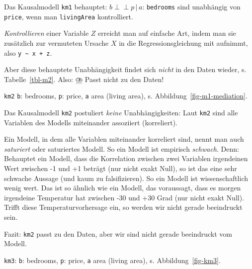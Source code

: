\documentclass[
  ngerman,
  letterpaper,
  twoside,
  open=any]{scrbook}
\theoremstyle{definition}
\theoremstyle{plain}
\theoremstyle{definition}
\theoremstyle{definition}
\theoremstyle{definition}
\theoremstyle{definition}
\theoremstyle{remark}
\begin{document}
Das Kausalmodell \texttt{km1} behauptet:
\(b \perp \!\!\! \perp p \, |\, a\): \texttt{bedrooms} sind unabhängig
von \texttt{price}, wenn man \texttt{livingArea} kontrolliert.

\emph{Kontrollieren} einer Variable \(Z\) erreicht man auf einfache Art,
indem man sie zusätzlich zur vermuteten Ursache \(X\) in die
Regressionsgleichung mit aufnimmt, also
\texttt{y\ \textasciitilde{}\ x\ +\ z}.

Aber diese behauptete Unabhängigkeit findet sich \emph{nicht} in den
Daten wieder, s. Tabelle~\ref{tbl-m2}. Also: ⛈️ Passt nicht zu den
Daten!

\texttt{km2} \texttt{b}: bedrooms, \texttt{p}: price, \texttt{a} area
(living area), s. Abbildung~\ref{fig-m1-mediation}.

Das Kausalmodell \texttt{km2} postuliert \emph{keine} Unabhängigkeiten:
Laut \texttt{km2} sind alle Variablen des Modells miteinander assoziiert
(korreliert).

\begin{tcolorbox}[enhanced jigsaw, arc=.35mm, bottomrule=.15mm, bottomtitle=1mm, breakable, colback=white, colbacktitle=quarto-callout-note-color!10!white, colframe=quarto-callout-note-color-frame, coltitle=black, left=2mm, leftrule=.75mm, opacityback=0, opacitybacktitle=0.6, rightrule=.15mm, title=\textcolor{quarto-callout-note-color}{\faInfo}\hspace{0.5em}{Hinweis}, titlerule=0mm, toprule=.15mm, toptitle=1mm]

Ein Modell, in dem alle Variablen miteinander korreliert sind, nennt man
auch \emph{saturiert} oder saturiertes Modell. So ein Modell ist
empirisch \emph{schwach}. Denn: Behauptet ein Modell, dass die
Korrelation zwischen zwei Variablen irgendeinen Wert zwischen -1 und +1
beträgt (nur nicht exakt Null), so ist das eine sehr schwache Aussage
(und kaum zu falsifizieren). So ein Modell ist wissenschaftlich wenig
wert. Das ist so ähnlich wie ein Modell, das voraussagt, dass es morgen
irgendeine Temperatur hat zwischen -30 und +30 Grad (nur nicht exakt
Null). Trifft diese Temperaturvorhersage ein, so werden wir nicht gerade
beeindruckt sein.

\end{tcolorbox}

Fazit: \texttt{km2} passt zu den Daten, aber wir sind nicht gerade
beeindruckt vom Modell.

\texttt{km3}: \texttt{b}: bedrooms, \texttt{p}: price, \texttt{a} area
(living area), s. Abbildung~\ref{fig-km3}.
\end{document}
